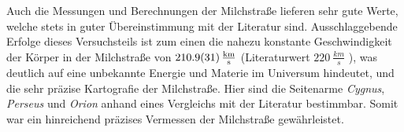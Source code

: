 Auch die Messungen und Berechnungen der Milchstraße lieferen sehr gute Werte, welche stets in guter Übereinstimmung mit der Literatur sind. Ausschlaggebende Erfolge dieses Versuchsteils ist zum einen die nahezu konstante Geschwindigkeit der Körper in der Milchstraße von $\SI{210.9 \pm 3.1}{\frac{km}{s}}$ (Literaturwert $\SI{220}{\frac{km}{s}}$ \cite{LSR}), was deutlich auf eine unbekannte Energie und Materie im Universum hindeutet, und die sehr präzise Kartografie der Milchstraße. Hier sind die Seitenarme \textit{Cygnus}, \textit{Perseus} und \textit{Orion} anhand eines Vergleichs mit der Literatur bestimmbar.
Somit war ein hinreichend präzises Vermessen der Milchstraße gewährleistet.